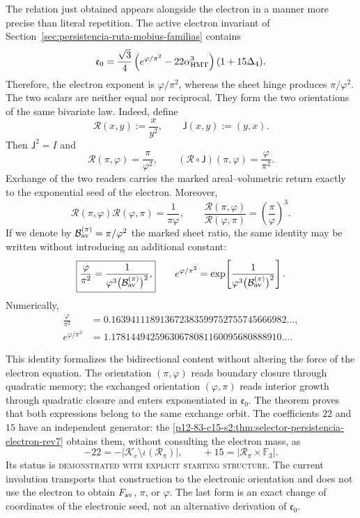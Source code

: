 The relation just obtained appears alongside the electron in a manner more
precise than literal repetition. The active electron invariant of
Section~\ref{sec:persistencia-ruta-mobius-familias} contains
\[
 \mathfrak e_0=
 \frac{\sqrt3}{4}
 \left(e^{\varphi/\pi^2}-22\alpha_{\rm HMT}^{3}\right)
 (1+15\Delta_4).
\]
Therefore, the electron exponent is \(\varphi/\pi^2\), whereas the
sheet hinge produces \(\pi/\varphi^2\). The two scalars are neither
equal nor reciprocal. They form the two orientations of the same
bivariate law. Indeed, define
\[
 \mathscr R(x,y):=\frac{x}{y^2},
 \qquad
 \mathsf J(x,y):=(y,x).
\]
Then \(\mathsf J^2=I\) and
\[
 \boxed{
 \mathscr R(\pi,\varphi)=\frac{\pi}{\varphi^2},
 \qquad
 (\mathscr R\circ\mathsf J)(\pi,\varphi)
 =\frac{\varphi}{\pi^2}.}
\]
Exchange of the two readers carries the marked areal--volumetric return
exactly to the exponential seed of the electron. Moreover,
\[
 \mathscr R(\pi,\varphi)\mathscr R(\varphi,\pi)
 =\frac1{\pi\varphi},
 \qquad
 \frac{\mathscr R(\pi,\varphi)}
 {\mathscr R(\varphi,\pi)}
 =\left(\frac{\pi}{\varphi}\right)^3.
\]
If we denote by
\(\mathcal B_{\rm av}^{(\pi)}=\pi/\varphi^2\) the marked sheet
ratio, the same identity may be written without introducing an additional
constant:
\[
 \boxed{
 \frac{\varphi}{\pi^2}
 =
 \frac{1}
 {\varphi^3\bigl(\mathcal B_{\rm av}^{(\pi)}\bigr)^2},}
 \qquad
 e^{\varphi/\pi^2}
 =
 \exp\!\left[
 \frac{1}
 {\varphi^3\bigl(\mathcal B_{\rm av}^{(\pi)}\bigr)^2}
 \right].
\]
Numerically,
\[
 \begin{aligned}
 \frac{\varphi}{\pi^2}
 &=0.163941118913672383599752755745666982\ldots,\\
 e^{\varphi/\pi^2}
 &=1.17814494259630678081160095680888910\ldots.
 \end{aligned}
\]

This identity formalizes the bidirectional content without altering the force of the electron equation. The orientation \((\pi,\varphi)\) reads boundary closure through quadratic memory; the exchanged orientation \((\varphi,\pi)\) reads interior growth through quadratic closure and enters exponentiated in \(\mathfrak e_0\). The theorem proves that both expressions belong to the same exchange orbit. The coefficients \(22\) and \(15\) have an independent generator: the \cref{p12-83-c15-s2:thm:selector-persistencia-electron-rev7} obtains them, without consulting the electron mass, as
\[
 -22=-\bigl|\mathcal K_e\setminus\iota(\mathscr R_\pi)\bigr|,
 \qquad
 +15=\bigl|\mathscr R_\pi\times\mathbb F_3\bigr|.
\]
Its status is \textsc{demonstrated with explicit starting structure}. The
current involution transports that construction to the electronic orientation and
does not use the electron to obtain \(F_{\rm av}\), \(\pi\), or \(\varphi\). The
last form is an exact change of coordinates of the electronic seed, not
an alternative derivation of \(\mathfrak e_0\).

